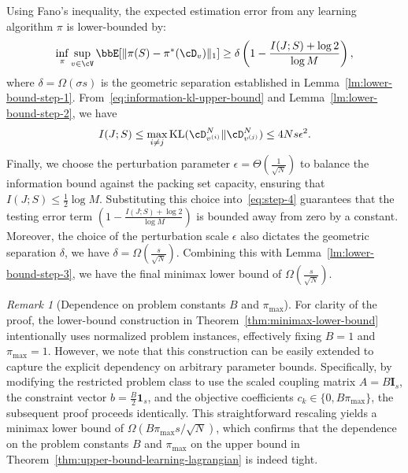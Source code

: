 \documentclass{article}
\theoremstyle{plain}
\theoremstyle{definition}
\theoremstyle{remark}
\newtheorem{remark}[theorem]{Remark}
\begin{document}
    Using Fano's inequality, the expected estimation error from any learning algorithm $\pi$ is lower-bounded by:
    \begin{equation} \label{eq:step-4}
        \inf_{\pi} \sup_{v \in \cV} \bbE[\|\pi(S) - \pi^*(\cD_v)\|_1] \geq \delta \left(1 - \frac{I(J; S) + \log 2}{\log M}\right),
    \end{equation}
    where $\delta = \Omega(\sigma s)$ is the geometric separation established in Lemma~\ref{lm:lower-bound-step-1}. From~\eqref{eq:information-kl-upper-bound} and Lemma~\ref{lm:lower-bound-step-2}, we have
    \[
        I(J; S) \leq \max_{i \neq j}\textup{KL}(\cD^N_{v^{(i)}} \| \cD^N_{v^{(j)}}) \leq 4N s\epsilon^2.
    \]
    Finally, we choose the perturbation parameter $\epsilon = \Theta\left(\frac{1}{\sqrt{N}}\right)$ to balance the information bound against the packing set capacity, ensuring that $I(J; S) \leq \frac{1}{2}\log M$. Substituting this choice into~\eqref{eq:step-4} guarantees that the testing error term $\left(1 - \frac{I(J; S) + \log 2}{\log M}\right)$ is bounded away from zero by a constant. Moreover, the choice of the perturbation scale $\epsilon$ also dictates the geometric separation $\delta$, we have $\delta = \Omega\left(\frac{s}{\sqrt{N}}\right)$. Combining this with Lemma~\ref{lm:lower-bound-step-3}, we have the final minimax lower bound of $\Omega\left(\frac{s}{\sqrt{N}}\right)$.
    

\begin{remark}[Dependence on problem constants $B$ and $\pi_{\max}$]
    For clarity of the proof, the lower-bound construction in Theorem~\ref{thm:minimax-lower-bound} intentionally uses normalized problem instances, effectively fixing $B = 1$ and $\pi_{\max} = 1$. However, we note that this construction can be easily extended to capture the explicit dependency on arbitrary parameter bounds. Specifically, by modifying the restricted problem class to use the scaled coupling matrix $A = B \mathbf{I}_s$, the constraint vector $b = \frac{B}{2}\mathbf{1}_s$, and the objective coefficients $c_k \in \{0, B\pi_{\max}\}$, the subsequent proof proceeds identically. This straightforward rescaling yields a minimax lower bound of $\Omega(B\pi_{\max}s/\sqrt{N})$, which confirms that the dependence on the problem constants $B$ and $\pi_{\max}$ on the upper bound in Theorem~\ref{thm:upper-bound-learning-lagrangian} is indeed tight.
\end{remark}
\end{document}
